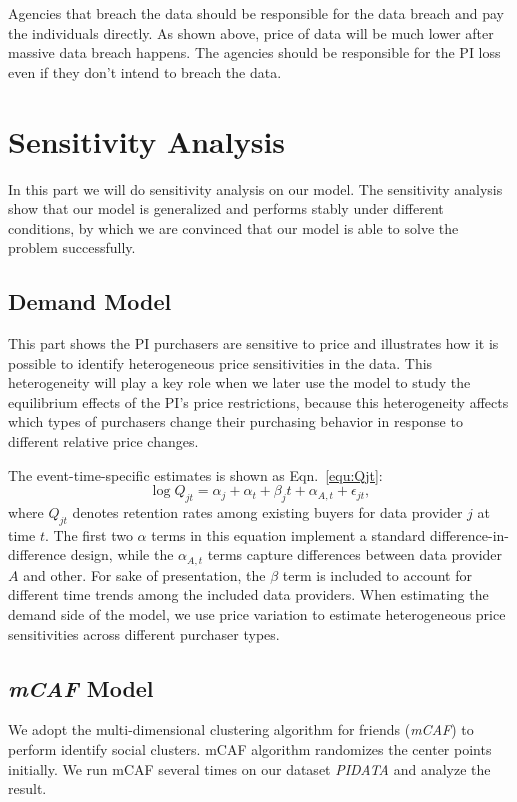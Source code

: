 \documentclass{mcmthesis}
\begin{document}
Agencies that breach the data should be responsible for the data breach and pay the individuals directly. As shown above, price of data will be much lower after massive data breach happens. The agencies should be responsible for the PI loss even if they don't intend to breach the data.

\section{Sensitivity Analysis}

In this part we will do sensitivity analysis on our model. The sensitivity analysis show that our model is generalized and performs stably under different conditions, by which we are convinced that our model is able to solve the problem successfully.

\subsection{Demand Model} This part shows the PI purchasers are sensitive to price and illustrates how it is possible to identify heterogeneous price sensitivities in the data. This heterogeneity will play a key role when we later use the model to study the equilibrium effects of the PI's price restrictions, because this heterogeneity affects which types of purchasers change their purchasing behavior in response to different relative price changes.

The event-time-specific estimates is shown as Eqn.~\eqref{equ:Qjt}:
\begin{equation}\label{equ:Qjt}
\log Q_{jt}=\alpha_j+\alpha_t+\beta_j t+\alpha_{A,t}+\epsilon_{jt},
\end{equation}
where $Q_{jt}$ denotes retention rates among existing buyers for data provider $j$ at time $t$. The first two $\alpha$ terms in this equation implement a standard difference-in-difference design, while the $\alpha_{A,t}$ terms capture differences between data provider $A$ and other. For sake of presentation, the $\beta$ term is included to account for different time trends among the included data providers.
When estimating the demand side of the model, we use price variation to estimate heterogeneous price sensitivities across different purchaser types. 

\subsection{\emph{mCAF} Model}
We adopt the multi-dimensional clustering algorithm for friends (\emph{mCAF}) to perform identify social clusters. mCAF algorithm  randomizes the center points initially. We run mCAF several times on our dataset \emph{PIDATA} and analyze the result. 
\end{document}
